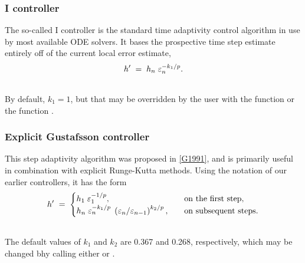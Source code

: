 \documentclass[letterpaper,10pt,english]{sphinxmanual}
\begin{document}
\subsubsection{I controller}
\label{Mathematics:i-controller}\label{Mathematics:mathematics-adaptivity-errorcontrol-i}
The so-called I controller is the standard time adaptivity control
algorithm in use by most available ODE solvers.  It bases the
prospective time step estimate entirely off of the current local error
estimate,
\begin{gather}
\begin{split}h' \;=\; h_n\; \varepsilon_n^{-k_1/p}.\end{split}\notag\\\begin{split}\end{split}\notag
\end{gather}
By default, $k_1=1$, but that may be overridden by the user with
the function {\hyperref[c_interface/User_callable:ARKodeSetAdaptivityMethod]{}} or the function
{\hyperref[f_interface/Usage:f/_/FARKSETADAPTIVITYMETHOD]{}}.


\subsubsection{Explicit Gustafsson controller}
\label{Mathematics:explicit-gustafsson-controller}\label{Mathematics:mathematics-adaptivity-errorcontrol-egus}
This step adaptivity algorithm was proposed in {\hyperref[References:g1991]{{[}G1991{]}}}, and
is primarily useful in combination with explicit Runge-Kutta methods.
Using the notation of our earlier controllers, it has the form
\label{Mathematics:equation-expGus}\begin{gather}
\begin{split}h' \;=\; \begin{cases}
   h_1\; \varepsilon_1^{-1/p}, &\quad\text{on the first step}, \\
   h_n\; \varepsilon_n^{-k_1/p}\;
     \left(\varepsilon_n/\varepsilon_{n-1}\right)^{k_2/p}, &
   \quad\text{on subsequent steps}.
\end{cases}\end{split}\label{Mathematics-expGus}\\\begin{split}\end{split}\notag
\end{gather}
The default values of $k_1$ and $k_2$ are 0.367 and 0.268,
respectively, which may be changed bhy calling either
{\hyperref[c_interface/User_callable:ARKodeSetAdaptivityMethod]{}} or {\hyperref[f_interface/Usage:f/_/FARKSETADAPTIVITYMETHOD]{}}.
\end{document}
